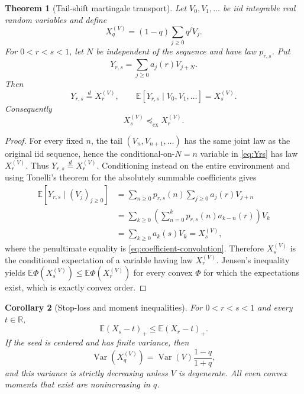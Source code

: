 \documentclass[11pt,a4paper]{article}
\newtheorem{theorem}{Theorem}[section]
\newtheorem{corollary}[theorem]{Corollary}
\theoremstyle{definition}
\newcommand{\R}{\mathbb{R}}
\newcommand{\E}{\mathbb{E}}
\newcommand{\Var}{\operatorname{Var}}
\newcommand{\1}{\mathbf{1}}
\begin{document}
\begin{theorem}[Tail-shift martingale transport]
\label{thm:martingale-transport}
Let $V_0,V_1,\ldots$ be iid integrable real random variables and define
\begin{equation}
 X_q^{(V)}=(1-q)\sum_{j\ge0}q^jV_j.
 \label{eq:general-seed}
\end{equation}
For $0<r<s<1$, let $N$ be independent of the sequence and have law
$p_{r,s}$.  Put
\begin{equation}
 Y_{r,s}=\sum_{j\ge0}a_j(r)V_{j+N}.
 \label{eq:Yrs}
\end{equation}
Then
\begin{equation}
 Y_{r,s}\overset d=X_r^{(V)},
 \qquad
 \E\!\left[Y_{r,s}\mid V_0,V_1,\ldots\right]=X_s^{(V)}.
 \label{eq:martingale-coupling}
\end{equation}
Consequently
\begin{equation}
 X_s^{(V)}\preceq_{\mathrm{cx}}X_r^{(V)}.
 \label{eq:convex-order}
\end{equation}
\end{theorem}

\begin{proof}
For every fixed $n$, the tail $(V_n,V_{n+1},\ldots)$ has the same joint law
as the original iid sequence, hence the conditional-on-$N=n$ variable in
\eqref{eq:Yrs} has law $X_r^{(V)}$.  Thus $Y_{r,s}\overset d=X_r^{(V)}$.
Conditioning instead on the entire environment and using Tonelli's theorem
for the absolutely summable coefficients gives
\begin{align*}
 \E[Y_{r,s}\mid(V_j)_{j\ge0}]
 &=\sum_{n\ge0}p_{r,s}(n)\sum_{j\ge0}a_j(r)V_{j+n}\\
 &=\sum_{k\ge0}\left(\sum_{n=0}^{k}p_{r,s}(n)a_{k-n}(r)\right)V_k\\
 &=\sum_{k\ge0}a_k(s)V_k
 =X_s^{(V)},
\end{align*}
where the penultimate equality is \eqref{eq:coefficient-convolution}.
Therefore $X_s^{(V)}$ is the conditional expectation of a variable having
law $X_r^{(V)}$.  Jensen's inequality yields
$\E\Phi(X_s^{(V)})\le\E\Phi(X_r^{(V)})$ for every convex $\Phi$ for which
the expectations exist, which is exactly convex order.
\end{proof}

\begin{corollary}[Stop-loss and moment inequalities]
\label{cor:stoploss}
For $0<r<s<1$ and every $t\in\R$,
\begin{equation}
 \E(X_s-t)_+\le \E(X_r-t)_+.
 \label{eq:stoploss}
\end{equation}
If the seed is centered and has finite variance, then
\begin{equation}
 \Var(X_q^{(V)})=\Var(V)\frac{1-q}{1+q},
 \label{eq:general-variance}
\end{equation}
and this variance is strictly decreasing unless $V$ is degenerate.  All
even convex moments that exist are nonincreasing in $q$.
\end{corollary}
\end{document}
